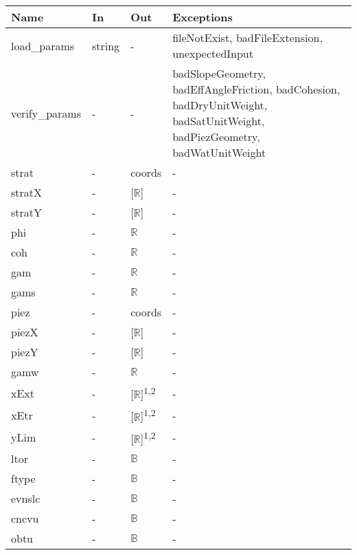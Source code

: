 \documentclass[12pt, titlepage]{article}
\begin{document}
\begin{center}
\renewcommand*{\arraystretch}{1.5}
\begin{tabular}{p{}  p{}  p{}  
p{} } \hline 

  \textbf{Name} & \textbf{In} & \textbf{Out} & \textbf{Exceptions} \\ \hline

   load\_params & string & - & 
   fileNotExist, badFileExtension, unexpectedInput  \\
   
   verify\_params & - & - & 
   badSlopeGeometry, badEffAngleFriction, badCohesion, badDryUnitWeight, 
   badSatUnitWeight, badPiezGeometry, badWatUnitWeight \\
   
   strat & - & coords & - \\
   stratX & - & [$\mathbb{R}$] & - \\
   stratY & - & [$\mathbb{R}$] & - \\
   phi & - & $\mathbb{R}$ & - \\
   coh & - & $\mathbb{R}$ & - \\
   gam & - & $\mathbb{R}$ & - \\
   gams & - & $\mathbb{R}$ & - \\
   piez & - & coords & - \\
   piezX & - & [$\mathbb{R}$] & - \\
   piezY & - & [$\mathbb{R}$] & - \\
   gamw & - & $\mathbb{R}$ & - \\
   xExt & - & [$\mathbb{R}$]\textsuperscript{1,2} & - \\
   xEtr & - & [$\mathbb{R}$]\textsuperscript{1,2} & - \\
   yLim & - & [$\mathbb{R}$]\textsuperscript{1,2} & - \\
   ltor & - & $\mathbb{B}$ & - \\
   ftype & - & $\mathbb{B}$ & - \\
   evnslc & - & $\mathbb{B}$ & - \\
   cncvu & - & $\mathbb{B}$ & - \\
   obtu & - & $\mathbb{B}$ & - \\
   \hline

\end{tabular}
\end{center}

\end{document}
